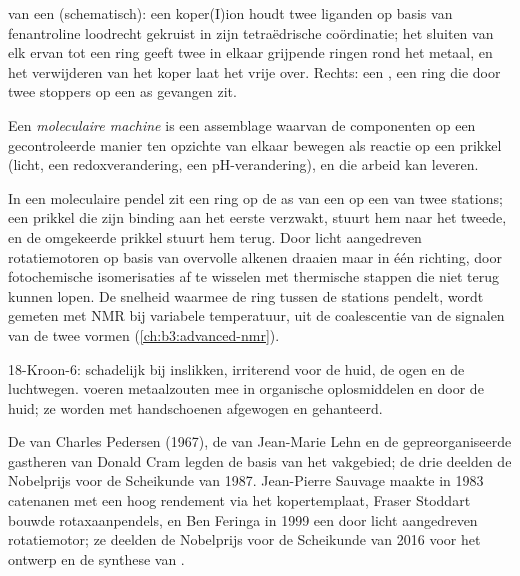 \begin{omfigure}
{\small {} van een  (schematisch): een koper(I)ion
houdt twee liganden op basis van fenantroline loodrecht gekruist in zijn
tetraëdrische coördinatie; het sluiten van elk ervan tot een ring geeft
twee in elkaar grijpende ringen rond het metaal, en het verwijderen van
het koper laat het vrije  over. Rechts: een , een ring
die door twee stoppers op een as gevangen zit.}
\end{omfigure}

\begin{definition}\label{def:b3:supramolecular:machine}
Een \emph{moleculaire machine} is een
assemblage waarvan de componenten op een gecontroleerde manier ten
opzichte van elkaar bewegen als reactie op een prikkel (licht, een
redoxverandering, een pH-verandering), en die arbeid kan leveren.
\end{definition}

In een moleculaire pendel zit een ring op de as van een  op een
van twee stations; een prikkel die zijn binding aan het eerste verzwakt,
stuurt hem naar het tweede, en de omgekeerde prikkel stuurt hem terug.
Door licht aangedreven rotatiemotoren op basis van overvolle alkenen
draaien maar in één richting, door fotochemische isomerisaties af te
wisselen met thermische stappen die niet terug kunnen lopen. De snelheid
waarmee de ring tussen de stations pendelt, wordt gemeten met NMR bij
variabele temperatuur, uit de coalescentie van de signalen van de twee
vormen (\cref{ch:b3:advanced-nmr}).

\begin{safety}{}
18-Kroon-6: schadelijk bij inslikken, irriterend voor de huid, de ogen en
de luchtwegen.  voeren metaalzouten mee in organische
oplosmiddelen en door de huid; ze worden met handschoenen afgewogen en
gehanteerd.
\end{safety}

\begin{history}
De  van Charles Pedersen (1967), de  van Jean-Marie
Lehn en de gepreorganiseerde gastheren van Donald Cram legden de basis
van het vakgebied; de drie deelden de Nobelprijs voor de Scheikunde van
1987. Jean-Pierre Sauvage maakte in 1983 catenanen met een hoog rendement
via het kopertemplaat, Fraser Stoddart bouwde rotaxaanpendels, en Ben
Feringa in 1999 een door licht aangedreven rotatiemotor; ze deelden de
Nobelprijs voor de Scheikunde van 2016 voor het ontwerp en de synthese
van .
\end{history}

